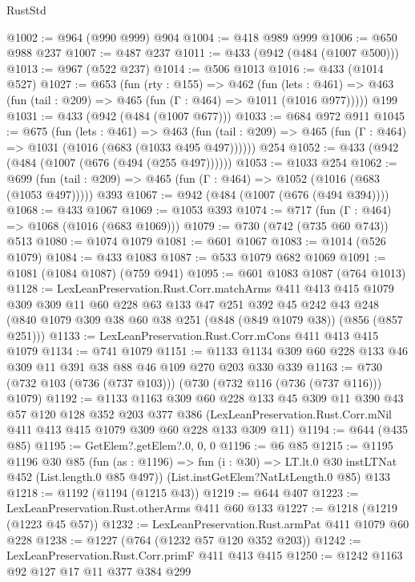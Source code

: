 \begin{lexlean}{RustStd}
\begin{coremodule}
{\begin{coremodule}
{{{{{{@1002 := @964 (@990 @999) @904
@1004 := @418 @989 @999
@1006 := @650 @988 @237
@1007 := @487 @237
@1011 := @433 (@942 (@484 (@1007 @500)))
@1013 := @967 (@522 @237)
@1014 := @506 @1013
@1016 := @433 (@1014 @527)
@1027 := @653
    (fun (rty : @155) =>
    @462
      (fun (lets : @461) =>
      @463 (fun (tail : @209) => @465 (fun (Γ : @464) => @1011 (@1016 @977)))))
    @199
@1031 := @433 (@942 (@484 (@1007 @677)))
@1033 := @684 @972 @911
@1045 := @675
    (fun (lets : @461) =>
    @463 (fun (tail : @209) => @465 (fun (Γ : @464) => @1031 (@1016 (@683 (@1033 @495 @497))))))
    @254
@1052 := @433 (@942 (@484 (@1007 (@676 (@494 (@255 @497))))))
@1053 := @1033 @254
@1062 := @699 (fun (tail : @209) => @465 (fun (Γ : @464) => @1052 (@1016 (@683 (@1053 @497))))) @393
@1067 := @942 (@484 (@1007 (@676 (@494 @394))))
@1068 := @433 @1067
@1069 := @1053 @393
@1074 := @717 (fun (Γ : @464) => @1068 (@1016 (@683 @1069)))
@1079 := @730 (@742 (@735 @60 @743)) @513
@1080 := @1074 @1079
@1081 := @601 @1067
@1083 := @1014 (@526 @1079)
@1084 := @433 @1083
@1087 := @533 @1079 @682 @1069
@1091 := @1081 (@1084 @1087) (@759 @941)
@1095 := @601 @1083 @1087 (@764 @1013)
@1128 := LexLeanPreservation.Rust.Corr.matchArms
    @411
    @413
    @415
    @1079
    @309
    @309
    @11
    @60
    @228
    @63
    @133
    @47
    @251
    @392
    @45
    @242
    @43
    @248
    (@840 @1079 @309 @38 @60 @38 @251 (@848 (@849 @1079 @38)) (@856 (@857 @251)))
@1133 := LexLeanPreservation.Rust.Corr.mCons @411 @413 @415 @1079
@1134 := @741 @1079
@1151 := @1133 @1134 @309 @60 @228 @133 @46 @309 @11 @391 @38 @88 @46 @109 @270 @203 @330 @339
@1163 := @730 (@732 @103 (@736 (@737 @103))) (@730 (@732 @116 (@736 (@737 @116))) @1079)
@1192 := @1133
    @1163
    @309
    @60
    @228
    @133
    @45
    @309
    @11
    @390
    @43
    @57
    @120
    @128
    @352
    @203
    @377
    @386
    (LexLeanPreservation.Rust.Corr.mNil @411 @413 @415 @1079 @309 @60 @228 @133 @309 @11)
@1194 := @644 (@435 @85)
@1195 := GetElem?.getElem?.{0, 0, 0}
@1196 := @6 @85
@1215 := @1195
    @1196
    @30
    @85
    (fun (as : @1196) => fun (i : @30) => LT.lt.{0} @30 instLTNat @452 (List.length.{0} @85 @497))
    (List.instGetElem?NatLtLength.{0} @85)
    @133
@1218 := @1192 (@1194 (@1215 @43))
@1219 := @644 @407
@1223 := LexLeanPreservation.Rust.otherArms @411 @60 @133
@1227 := @1218 (@1219 (@1223 @45 @57))
@1232 := LexLeanPreservation.Rust.armPat @411 @1079 @60 @228
@1238 := @1227 (@764 (@1232 @57 @120 @352 @203))
@1242 := LexLeanPreservation.Rust.Corr.primF @411 @413 @415
@1250 := @1242 @1163 @92 @127 @17 @11 @377 @384 @299
}}}}}}
\end{coremodule}}
\end{coremodule}
\end{lexlean}
